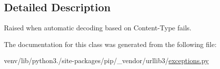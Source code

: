 \subsection{Detailed Description}
\begin{DoxyVerb}Raised when automatic decoding based on Content-Type fails.\end{DoxyVerb}
 

The documentation for this class was generated from the following file\+:\begin{DoxyCompactItemize}
\item 
venv/lib/python3./site-\/packages/pip/\+\_\+vendor/urllib3/\hyperlink{pip_2__vendor_2urllib3_2exceptions_8py}{exceptions.\+py}\end{DoxyCompactItemize}
